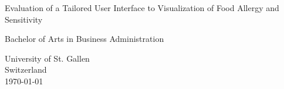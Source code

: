 
\begin{titlepage}
    \begin{center}
        \vspace*{1cm}
        
        \huge
        \textbf{\thetitle}
        
        \vspace{0.5cm}
        \LARGE
        Evaluation of a Tailored User Interface to Visualization of Food Allergy and Sensitivity
        
        \vspace{0.5cm}
       
       \large
        \textbf{\theauthor}
        
        \vfill
        
        Bachelor of Arts in Business Administration
        
        
        
        
        University of St. Gallen\\
        Switzerland\\
        \today
        
    \end{center}
\end{titlepage}
